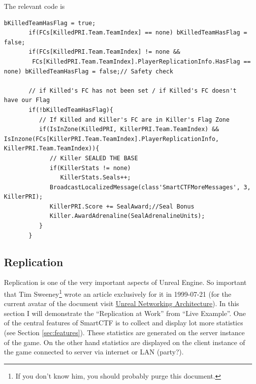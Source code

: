 \documentclass{article}
\begin{document}
The relevant code is
\begin{lstlisting}[frame=single]
  bKilledTeamHasFlag = true;
       if(FCs[KilledPRI.Team.TeamIndex] == none) bKilledTeamHasFlag = false;
       if(FCs[KilledPRI.Team.TeamIndex] != none &&
        FCs[KilledPRI.Team.TeamIndex].PlayerReplicationInfo.HasFlag == none) bKilledTeamHasFlag = false;// Safety check

       // if Killed's FC has not been set / if Killed's FC doesn't have our Flag
       if(!bKilledTeamHasFlag){
          // If Killed and Killer's FC are in Killer's Flag Zone
          if(IsInZone(KilledPRI, KillerPRI.Team.TeamIndex) && IsInzone(FCs[KillerPRI.Team.TeamIndex].PlayerReplicationInfo, KillerPRI.Team.TeamIndex)){
             // Killer SEALED THE BASE
             if(KillerStats != none)
                KillerStats.Seals++;
             BroadcastLocalizedMessage(class'SmartCTFMoreMessages', 3, KillerPRI);
             KillerPRI.Score += SealAward;//Seal Bonus
             Killer.AwardAdrenaline(SealAdrenalineUnits);
          }
       }
\end{lstlisting}

\subsection{Replication}
Replication is one of the very important aspects of Unreal Engine.  So important that Tim Sweeney\footnote{If you don't know him, you should probably purge this document.} wrote an article exclusively for it in 1999-07-21 (for the current avatar of the document visit \href{https://api.unrealengine.com/udk/Three/NetworkingOverview.html}{{\color{Blue}Unreal Networking Architecture}}).  In this section I will demonstrate the ``Replication at Work'' from ``Live Example''.  One of the central features of SmartCTF is to collect and display lot more statistics (see Section \ref{sec:features}).  These statistics are generated on the server instance of the game.  On the other hand statistics are displayed on the client instance of the game connected to server via internet or LAN (party?).
\end{document}
